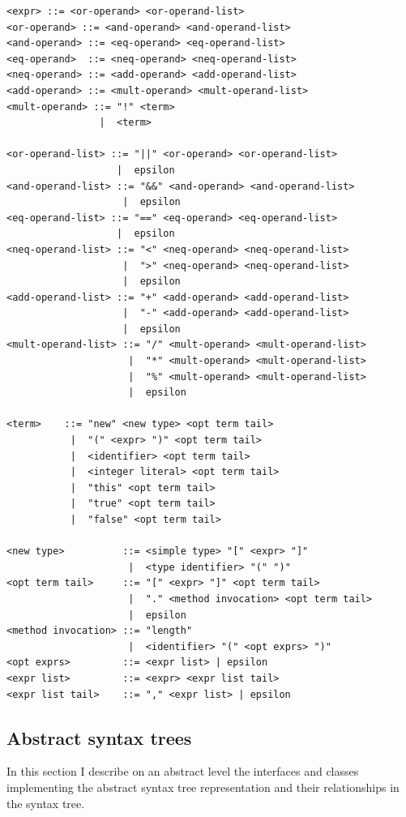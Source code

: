 \documentclass[a4paper,11pt]{article}
\begin{document}
\begin{verbatim}
<expr> ::= <or-operand> <or-operand-list>
<or-operand> ::= <and-operand> <and-operand-list>
<and-operand> ::= <eq-operand> <eq-operand-list>
<eq-operand>  ::= <neq-operand> <neq-operand-list>
<neq-operand> ::= <add-operand> <add-operand-list>
<add-operand> ::= <mult-operand> <mult-operand-list>
<mult-operand> ::= "!" <term>
                |  <term>

<or-operand-list> ::= "||" <or-operand> <or-operand-list>
                   |  epsilon
<and-operand-list> ::= "&&" <and-operand> <and-operand-list>
                    |  epsilon
<eq-operand-list> ::= "==" <eq-operand> <eq-operand-list>
                   |  epsilon
<neq-operand-list> ::= "<" <neq-operand> <neq-operand-list>
                    |  ">" <neq-operand> <neq-operand-list>
                    |  epsilon
<add-operand-list> ::= "+" <add-operand> <add-operand-list>
                    |  "-" <add-operand> <add-operand-list>
                    |  epsilon
<mult-operand-list> ::= "/" <mult-operand> <mult-operand-list>
                     |  "*" <mult-operand> <mult-operand-list>
                     |  "%" <mult-operand> <mult-operand-list>
                     |  epsilon

<term>    ::= "new" <new type> <opt term tail>
           |  "(" <expr> ")" <opt term tail>
           |  <identifier> <opt term tail>
           |  <integer literal> <opt term tail>
           |  "this" <opt term tail>
           |  "true" <opt term tail>
           |  "false" <opt term tail>

<new type>          ::= <simple type> "[" <expr> "]"
                     |  <type identifier> "(" ")"
<opt term tail>     ::= "[" <expr> "]" <opt term tail>
                     |  "." <method invocation> <opt term tail>
                     |  epsilon
<method invocation> ::= "length"
                     |  <identifier> "(" <opt exprs> ")"
<opt exprs>         ::= <expr list> | epsilon
<expr list>         ::= <expr> <expr list tail>
<expr list tail>    ::= "," <expr list> | epsilon

\end{verbatim}

\subsection{Abstract syntax trees}

In this section I describe on an abstract level the interfaces and classes implementing the abstract syntax tree representation and their relationships in the syntax tree.
\end{document}
